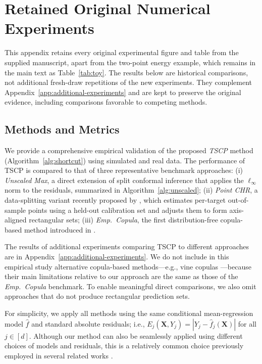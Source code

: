 \section{Retained Original Numerical Experiments}
\label{app:legacy-experiments}
\begingroup
\color{blue}
\setlength{\emergencystretch}{2em}

{\color{blue}This appendix retains every original experimental figure and
table from the supplied manuscript, apart from the two-point energy example,
which remains in the main text as Table~\ref{tab:toy}. The results below are
historical comparisons, not additional fresh-draw repetitions of the new
experiments. They complement Appendix~\ref{app:additional-experiments} and
are kept to preserve the original evidence, including comparisons favorable
to competing methods.}


\subsection{Methods and Metrics}

We provide a comprehensive empirical validation of the proposed \emph{TSCP} method (Algorithm~\ref{alg:shortcut}) using simulated and real data. 
The performance of TSCP is compared to that of three representative benchmark approaches: (i) \emph{Unscaled Max}, a direct extension of split conformal inference that applies the $\ell_\infty$ norm to the residuals, summarized in Algorithm~\ref{alg:unscaled}; (ii) \emph{Point CHR}, a data-splitting variant recently proposed by \citet{sampson2024conformal}, which estimates per-target out-of-sample points using a held-out calibration set and adjusts them to form axis-aligned rectangular sets; (iii) \emph{Emp.~Copula}, the first distribution-free copula-based method introduced in \citet{messoudi2021copula}. 

The results of additional experiments comparing TSCP to different approaches are in Appendix~\ref{app:additional-experiments}.
We do not include in this empirical study alternative copula-based methods---e.g., vine copulas \citep{pmlr-v258-park25c}---because their main limitations relative to our approach are the same as those of the \emph{Emp.~Copula} benchmark.
To enable meaningful direct comparisons, we also omit approaches that do not produce rectangular prediction sets.

For simplicity, we apply all methods using the same conditional mean-regression model $\hat{f}$ and standard absolute residuals; i.e., $E_j(\mathbf X,Y_j)=|Y_j-\hat{f}_j(\mathbf X)|$ for all $j\in [d]$. Although our method can also be seamlessly applied using different choices of models and residuals, this is a relatively common choice previously employed in several related works \citep{sampson2024conformal, pmlr-v258-park25c, dheur2025unified}.


